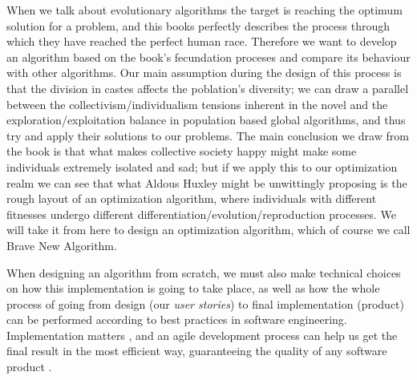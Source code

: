 When we talk about evolutionary algorithms the target is reaching the
optimum solution for a problem, and this books perfectly describes
the process through which they have reached the perfect human
race. Therefore we want to develop an algorithm based on the book's
fecundation proceses and compare its behaviour with other
algorithms. Our main assumption during the design of this process is
that the division in castes affects the
poblation's diversity; we can draw a parallel between the
collectivism/individualism tensions inherent in the novel and the
exploration/exploitation balance in population based global
algorithms, and thus try and apply their solutions to our
problems. The main conclusion we draw from the book is that what makes
collective society happy might make some individuals extremely
isolated and sad; but if we apply this to our optimization realm we
can see that what Aldous Huxley might be unwittingly proposing is the
rough layout of an optimization algorithm, where individuals with
different fitnesses undergo different
differentiation/evolution/reproduction processes. We will take it from
here to design an optimization algorithm, which of course we call Brave
New Algorithm.

When designing an algorithm from scratch, we must also make technical
choices on how this implementation is going to take place, as well as
how the whole process of going from design (our {\em user stories}) to
final implementation (product) can be performed according to best
practices in software engineering. Implementation matters
\cite{merelo2011implementation}, and an agile development process can
help us get the final result in the most efficient way, guaranteeing
the quality of any software product \cite{DBLP:journals/corr/abs-2104-12545}.

